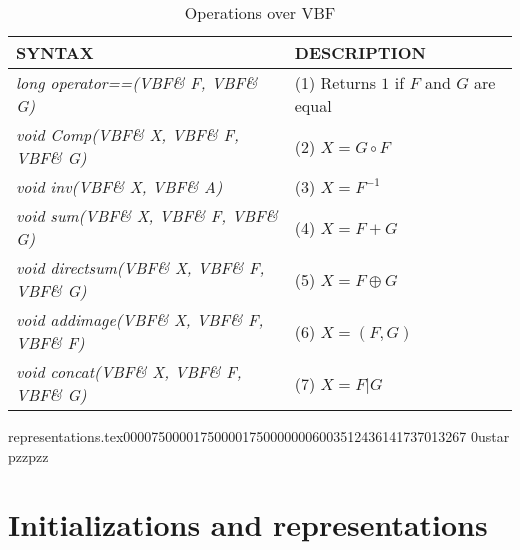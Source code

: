 \begin{table}[htbp]%
\caption{Operations over VBF\label{tab:Operations}}{
\begin{tabular}{|l|l|}
\hline
SYNTAX & DESCRIPTION\\\hline
\textsl{long operator==(VBF\& F, VBF\& G)} & (1) Returns $1$ if $F$ and $G$ are equal\\\hline
\textsl{void Comp(VBF\& X, VBF\& F, VBF\& G)} & (2) $X = G \circ F$\\\hline
\textsl{void inv(VBF\& X, VBF\& A)} & (3) $X = F^{-1}$\\\hline
\textsl{void sum(VBF\& X, VBF\& F, VBF\& G)} & (4) $X = F+G$\\\hline
\textsl{void directsum(VBF\& X, VBF\& F, VBF\& G)} & (5) $X = F \oplus G$\\\hline
\textsl{void addimage(VBF\& X, VBF\& F, VBF\& F)} & (6) $X = (F,G)$\\\hline
\textsl{void concat(VBF\& X, VBF\& F, VBF\& G)} & (7) $X = F | G$\\\hline
\end{tabular}}
\end{table}%

                                                                                                                                                                                                                                                                                                                                                                                                                                                                                           representations.tex                                                                                 0000750 0001750 0001750 00000060035 12436141737 013267  0                                                                                                    ustar   pzz                             pzz                                                                                                                                                                                                                    
\chapter{Initializations and representations}

